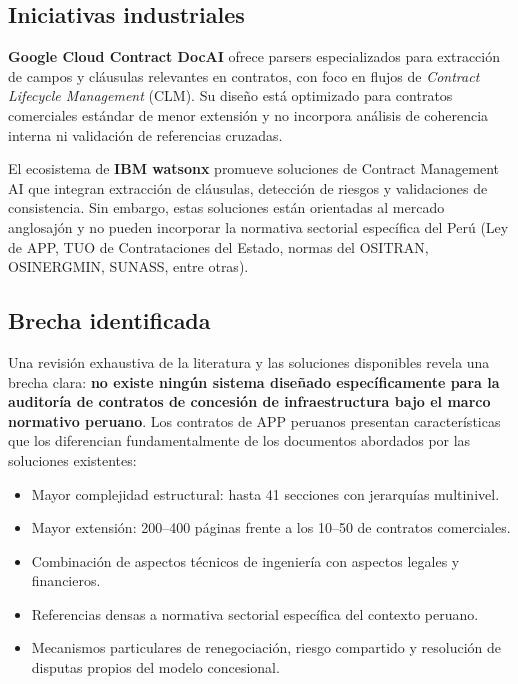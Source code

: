 \subsection*{Iniciativas industriales}

\textbf{Google Cloud Contract DocAI} \cite{google_contract_docai_2021,google_document_ai}
ofrece parsers especializados para extracción de campos y cláusulas relevantes en
contratos, con foco en flujos de \textit{Contract Lifecycle Management} (CLM). Su
diseño está optimizado para contratos comerciales estándar de menor extensión y no
incorpora análisis de coherencia interna ni validación de referencias cruzadas.

El ecosistema de \textbf{IBM watsonx} \cite{ibm_contracts_ai_aws,ibm_watsonx_contracts_2024}
promueve soluciones de Contract Management AI que integran extracción de cláusulas,
detección de riesgos y validaciones de consistencia. Sin embargo, estas soluciones
están orientadas al mercado anglosajón y no pueden incorporar la normativa sectorial
específica del Perú (Ley de APP, TUO de Contrataciones del Estado, normas del
OSITRAN, OSINERGMIN, SUNASS, entre otras).

\subsection*{Brecha identificada}

Una revisión exhaustiva de la literatura y las soluciones disponibles revela una
brecha clara: \textbf{no existe ningún sistema diseñado específicamente para la
auditoría de contratos de concesión de infraestructura bajo el marco normativo
peruano}. Los contratos de APP peruanos presentan características que los diferencian
fundamentalmente de los documentos abordados por las soluciones existentes:

\begin{itemize}
    \item Mayor complejidad estructural: hasta 41 secciones con jerarquías multinivel.
    \item Mayor extensión: 200--400 páginas frente a los 10--50 de contratos comerciales.
    \item Combinación de aspectos técnicos de ingeniería con aspectos legales y financieros.
    \item Referencias densas a normativa sectorial específica del contexto peruano.
    \item Mecanismos particulares de renegociación, riesgo compartido y resolución de
    disputas propios del modelo concesional.
\end{itemize}

